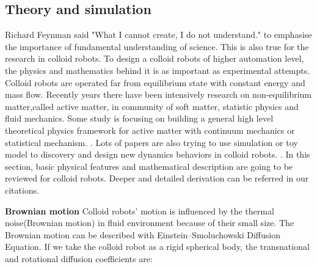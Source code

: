 \subsection{Theory and simulation}
Richard Feynman said "What I cannot create, I do not understand." to emphasise the importance of fundamental understanding of science. This is also true for the  research in colloid robots. To design a colloid robots of higher automation level, the physics and mathematics behind it is as  important as  experimental attempts. Colloid robots are operated far from equilibrium state with constant energy and mass flow. Recently years there have been intensively research on non-equilibrium matter,called active matter, in community of soft matter, statistic physics and fluid mechanics. Some study is focusing on building a general high level theoretical physics framework for active matter with continuum mechanics or statistical mechanism. \cite{stenhammar2013continuum,solon2015pressure,fodor2016far}. Lots of papers are also trying to use simulation or toy model to discovery and design new dynamics behaviors in colloid robots. \cite{bechinger2016active,speck2014effective,ten2011brownian}. In this section,  basic physical features and mathematical description are going to be reviewed for colloid robots.  Deeper and detailed derivation can be referred in our citations.

\textbf{Brownian motion} Colloid robots' motion is influenced by the thermal noise(Brownian motion) in fluid environment because of their small size. The Brownian motion can be described with Einstein–Smoluchowski Diffusion Equation.\cite{islam2004einstein} If we take the colloid robot as  a rigid spherical body, the transnational and rotational diffusion coefficients are: 

